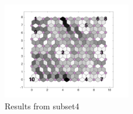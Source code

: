 \begin{figure}
        \centering
        \includegraphics[width=0.5\textwidth]{../../images0.01/M31/2D/image_subsets/subset4_dist_with_hits_t.png}
    \caption{Results from subset4}
    \label{fig: subset4}
\end{figure}